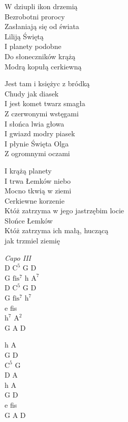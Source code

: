 \begin{text}
    \hfill\break
W dziupli ikon drzemią\\
Bezrobotni prorocy\\
Zasłaniają się od świata\\
Liliją Świętą\\
I planety podobne\\
Do słoneczników krążą\\
Modrą kopułą cerkiewną

\vin Jest tam i księżyc z bródką\\
\vin Chudy jak diasek\\
\vin I jest komet twarz smagła\\
\vin Z czerwonymi wstęgami\\
\vin I słońca lwia głowa\\
\vin I gwiazd modry piasek\\
\vin I płynie Święta Olga\\
\vin Z ogromnymi oczami

I krążą planety\\
I trwa Łemków niebo\\
Mocno tkwią w ziemi\\
Cerkiewne korzenie\\
Któż zatrzyma w jego jastrzębim locie\\
Słońce Łemków\\
Któż zatrzyma ich małą, huczącą\\
jak trzmiel ziemię
\end{text}
\begin{chord}
    \textit{Capo III}\\
    D $\mathrm{C^5}$ G D\\
    G $\mathrm{fis^7}$ h $\mathrm{A^7}$\\
    D $\mathrm{C^5}$ G D\\
    G $\mathrm{fis^7}$ $\mathrm{h^7}$\\
    e fis\\
    $\mathrm{h^7}$ $\mathrm{A^2}$\\
    G A D

    h A\\
    G D\\
    $\mathrm{C^5}$ G\\
    D A\\
    h A\\
    G D\\
    e fis\\
    G A D
\end{chord}
